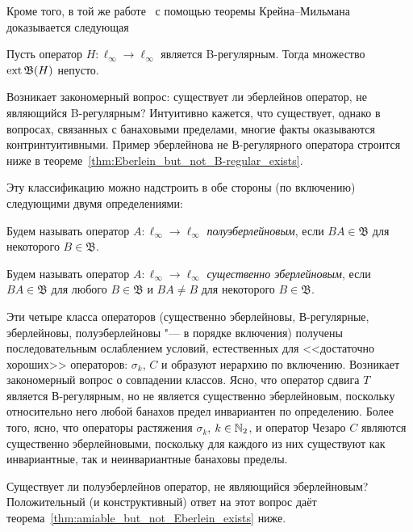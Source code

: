 Кроме того, в той же работе~\cite{alekhno2018invariant}
с помощью теоремы Крейна--Мильмана~\cite[Theorem  9.14]{aliprantis2006positive}
доказывается следующая
\begin{lemma}
	Пусть оператор $H:\ell_\infty\to\ell_\infty$ является B-регулярным.
	Тогда множество $\operatorname{ext}\mathfrak{B}(H)$ непусто.
\end{lemma}

Возникает закономерный вопрос: существует ли эберлейнов оператор, не являющийся B-регулярным?
Интуитивно кажется, что существует, однако в вопросах, связанных с банаховыми пределами,
многие факты оказываются контринтуитивными.
Пример эберлейнова не В-регулярного оператора строится ниже
в теореме~\ref{thm:Eberlein_but_not_B-regular_exists}.

Эту классификацию можно надстроить в обе стороны (по включению) следующими двумя определениями:

\begin{definition}
	Будем называть оператор $A:\ell_\infty \to \ell_\infty$ \emph{полуэберлейновым}, если $BA\in\mathfrak B$ для некоторого $B\in\mathfrak B$.
\end{definition}

\begin{definition}
	Будем называть оператор $A:\ell_\infty \to \ell_\infty$ \emph{существенно эберлейновым}, если $BA\in\mathfrak B$ для любого $B\in\mathfrak B$ и $BA\ne B$ для некоторого $B\in\mathfrak B$.
\end{definition}

Эти четыре класса операторов (существенно эберлейновы, В-регулярные, эберлейновы, полуэберлейновы "--- в порядке включения)
получены последовательным ослаблением условий, естественных для <<достаточно хороших>> операторов:
$\sigma_k$, $C$
и образуют иерархию по включению.
Возникает закономерный вопрос о совпадении классов.
Ясно, что оператор сдвига $T$ является В-регулярным, но не является существенно эберлейновым, поскольку относительно него любой банахов предел инвариантен по определению.
Более того, ясно, что операторы растяжения $\sigma_k$, $k\in\mathbb{N}_2$, и оператор Чезаро $C$ являются существенно эберлейновыми,
поскольку для каждого из них существуют как инвариантные, так и неинвариантные банаховы пределы.

Существует ли полуэберлейнов оператор, не являющийся эберлейновым?
Положительный (и конструктивный) ответ на этот вопрос даёт теорема~\ref{thm:amiable_but_not_Eberlein_exists} ниже.



